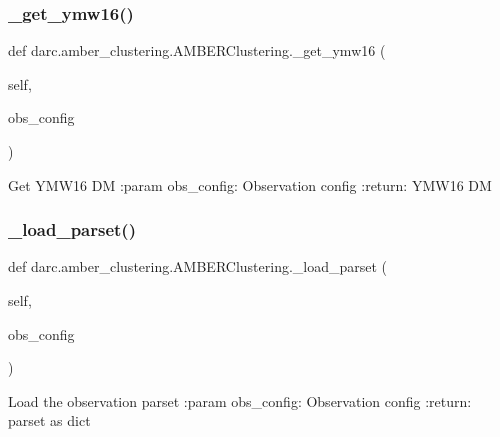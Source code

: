 \subsubsection{\texorpdfstring{\_get\_ymw16()}{\_get\_ymw16()}}
{\footnotesize\ttfamily def darc.\+amber\+\_\+clustering.\+A\+M\+B\+E\+R\+Clustering.\+\_\+get\+\_\+ymw16 (\begin{DoxyParamCaption}\item[{}]{self,  }\item[{}]{obs\+\_\+config }\end{DoxyParamCaption})\hspace{0.3cm}{\ttfamily [private]}}

\begin{DoxyVerb}Get YMW16 DM
:param obs_config: Observation config
:return: YMW16 DM
\end{DoxyVerb}
 \mbox{\label{classdarc_1_1amber__clustering_1_1_a_m_b_e_r_clustering_ad81eb0036c64f14cd02598730dfdc9ef}} 
\subsubsection{\texorpdfstring{\_load\_parset()}{\_load\_parset()}}
{\footnotesize\ttfamily def darc.\+amber\+\_\+clustering.\+A\+M\+B\+E\+R\+Clustering.\+\_\+load\+\_\+parset (\begin{DoxyParamCaption}\item[{}]{self,  }\item[{}]{obs\+\_\+config }\end{DoxyParamCaption})\hspace{0.3cm}{\ttfamily [private]}}

\begin{DoxyVerb}Load the observation parset
:param obs_config: Observation config
:return: parset as dict
\end{DoxyVerb}
 \mbox{\label{classdarc_1_1amber__clustering_1_1_a_m_b_e_r_clustering_a11eafae05835a77e02937e8914a01d53}} 
